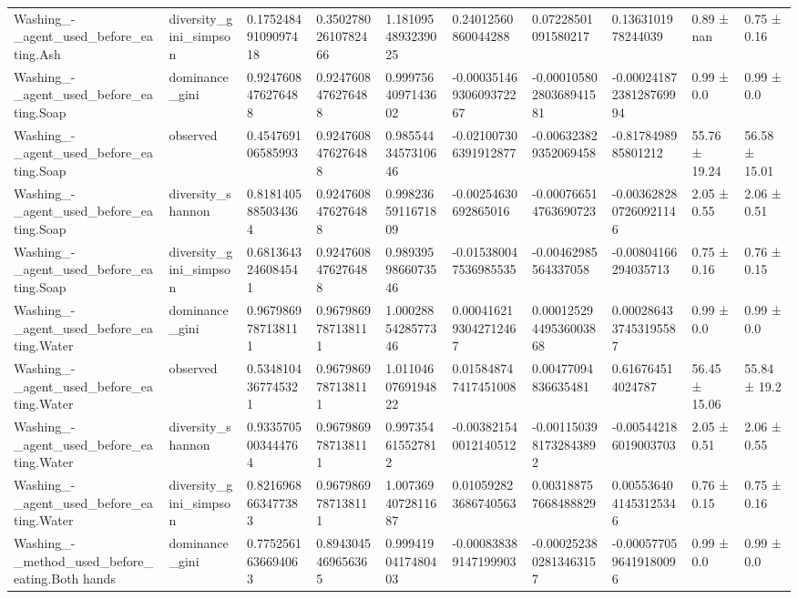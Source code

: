 \begin{longtable}{llllllllll}
Washing\_-\_agent\_used\_before\_eating.Ash & diversity\_gini\_simpson & 0.17524849109097418 & 0.35027802610782466 & 1.1810954893239025 & 0.24012560860044288 & 0.07228501091580217 & 0.1363101978244039 & 0.89 ± nan & 0.75 ± 0.16 \\
Washing\_-\_agent\_used\_before\_eating.Soap & dominance\_gini & 0.9247608476276488 & 0.9247608476276488 & 0.9997564097143602 & -0.00035146930609372267 & -0.00010580280368941581 & -0.00024187238128769994 & 0.99 ± 0.0 & 0.99 ± 0.0 \\
Washing\_-\_agent\_used\_before\_eating.Soap & observed & 0.454769106585993 & 0.9247608476276488 & 0.9855443457310646 & -0.021007306391912877 & -0.006323829352069458 & -0.8178498985801212 & 55.76 ± 19.24 & 56.58 ± 15.01 \\
Washing\_-\_agent\_used\_before\_eating.Soap & diversity\_shannon & 0.8181405885034364 & 0.9247608476276488 & 0.9982365911671809 & -0.00254630692865016 & -0.000766514763690723 & -0.0036282807260921146 & 2.05 ± 0.55 & 2.06 ± 0.51 \\
Washing\_-\_agent\_used\_before\_eating.Soap & diversity\_gini\_simpson & 0.6813643246084541 & 0.9247608476276488 & 0.9893959866073546 & -0.015380047536985535 & -0.00462985564337058 & -0.00804166294035713 & 0.75 ± 0.16 & 0.76 ± 0.15 \\
Washing\_-\_agent\_used\_before\_eating.Water & dominance\_gini & 0.9679869787138111 & 0.9679869787138111 & 1.0002885428577346 & 0.0004162193042712467 & 0.00012529449536003868 & 0.0002864337453195587 & 0.99 ± 0.0 & 0.99 ± 0.0 \\
Washing\_-\_agent\_used\_before\_eating.Water & observed & 0.5348104367745321 & 0.9679869787138111 & 1.0110460769194822 & 0.015848747417451008 & 0.00477094836635481 & 0.616764514024787 & 56.45 ± 15.06 & 55.84 ± 19.2 \\
Washing\_-\_agent\_used\_before\_eating.Water & diversity\_shannon & 0.9335705003444764 & 0.9679869787138111 & 0.997354615527812 & -0.003821540012140512 & -0.0011503981732843892 & -0.005442186019003703 & 2.05 ± 0.51 & 2.06 ± 0.55 \\
Washing\_-\_agent\_used\_before\_eating.Water & diversity\_gini\_simpson & 0.8216968663477383 & 0.9679869787138111 & 1.0073694072811687 & 0.010592823686740563 & 0.003188757668488829 & 0.0055364041453125346 & 0.76 ± 0.15 & 0.75 ± 0.16 \\
Washing\_-\_method\_used\_before\_eating.Both hands & dominance\_gini & 0.7752561636694063 & 0.8943045469656365 & 0.9994190417480403 & -0.000838389147199903 & -0.0002523802813463157 & -0.0005770596419180096 & 0.99 ± 0.0 & 0.99 ± 0.0 \\

\end{longtable}
